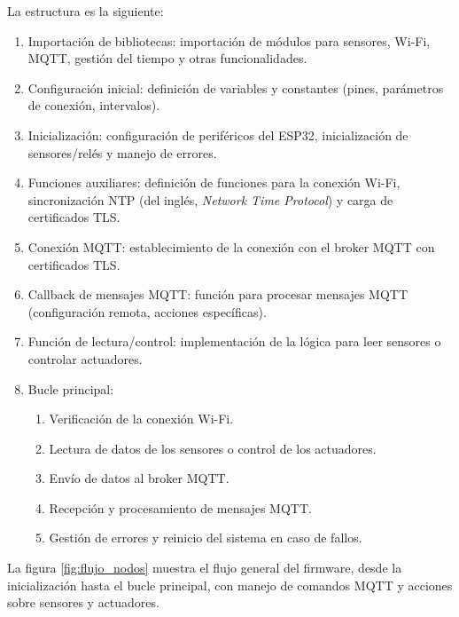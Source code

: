 La estructura es la siguiente:

\begin{enumerate}
    \item Importación de bibliotecas: importación de módulos para sensores, Wi-Fi, MQTT,
          gestión del tiempo y otras funcionalidades.
    \item Configuración inicial: definición de variables y constantes (pines, parámetros
          de conexión, intervalos).
    \item Inicialización: configuración de periféricos del ESP32, inicialización de
          sensores/relés y manejo de errores.
    \item Funciones auxiliares: definición de funciones para la conexión Wi-Fi,
          sincronización NTP (del inglés, \textit{Network Time Protocol}) y carga de
          certificados TLS.
    \item Conexión MQTT: establecimiento de la conexión con el broker MQTT con
          certificados TLS.
    \item Callback de mensajes MQTT: función para procesar mensajes MQTT (configuración
          remota, acciones específicas).
    \item Función de lectura/control: implementación de la lógica para leer sensores o
          controlar actuadores.
    \item Bucle principal:
          \begin{enumerate}
              \item Verificación de la conexión Wi-Fi.
              \item Lectura de datos de los sensores o control de los actuadores.
              \item Envío de datos al broker MQTT.
              \item Recepción y procesamiento de mensajes MQTT.
              \item Gestión de errores y reinicio del sistema en caso de fallos.
          \end{enumerate}
\end{enumerate}

La figura \ref{fig:flujo_nodos} muestra el flujo general del firmware, desde la
inicialización hasta el bucle principal, con manejo de comandos MQTT y acciones
sobre sensores y actuadores.

